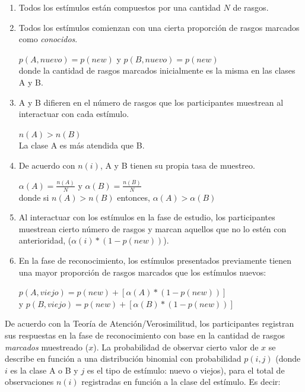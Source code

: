 \begin{enumerate}
\item Todos los estímulos están compuestos por una cantidad $N$ de rasgos.\\

\item Todos los estímulos comienzan con una cierta proporción de rasgos marcados como \textit{conocidos}.
\begin{center}
$p(A,nuevo) = p(new)$ \qquad y \qquad $p(B,nuevo) = p(new)$\\
donde la cantidad de rasgos marcados inicialmente es la misma en las clases A y B.\\
\end{center}

\item A y B difieren en el número de rasgos que los participantes muestrean al interactuar con cada estímulo.
\begin{center}
$n(A) > n(B)$\\
La clase A es más atendida que B.\\
\end{center}

\item De acuerdo con $n(i)$, A y B tienen su propia tasa de muestreo.
\begin{center}
$\alpha(A) = \frac{n(A)}{N}$ \qquad y \qquad $\alpha(B) = \frac{n(B)}{N}$\\
donde si $n(A) > n(B)$ entonces, $\alpha(A) > \alpha(B)$\\
\end{center}

\item Al interactuar con los estímulos en la fase de estudio, los participantes muestrean cierto número de rasgos y marcan aquellos que no lo estén con anterioridad, ($\alpha(i)*(1-p(new))$).\\

\item En la fase de reconocimiento, los estímulos presentados previamente tienen una mayor proporción de rasgos marcados que los estímulos nuevos:
\begin{center}
$p(A,viejo) = p(new) + [\alpha(A)*(1-p(new))]$\\
y \quad $p(B,viejo) = p (new) + [\alpha(B)*(1-p(new))]$\\
\end{center}
\end{enumerate}

De acuerdo con la Teoría de Atención/Verosimilitud, los participantes registran sus respuestas en la fase de reconocimiento con base en la cantidad de rasgos \textit{marcados} muestreado ($x$). La probabilidad de observar cierto valor de $x$ se describe en función a una distribución binomial con probabilidad $p(i,j)$ (donde $i$ es la clase A o B y $j$ es el tipo de estímulo: nuevo o viejos), para el total de observaciones $n(i)$ registradas en función a la clase del estímulo. Es decir:

